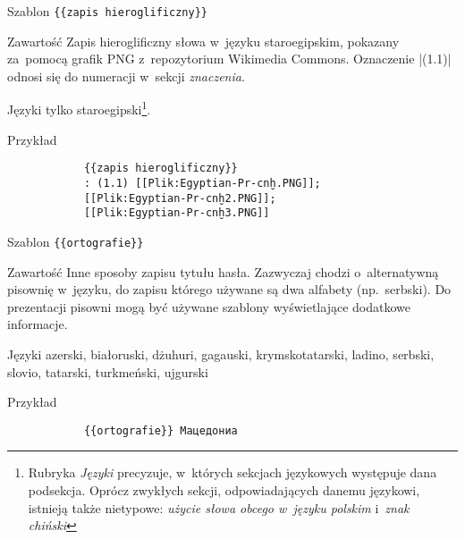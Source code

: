 \documentclass{pracamgr}
\begin{document}
\begin{opis}
	\item[Szablon] \verb|{{zapis hieroglificzny}}|
	\item[Zawartość] Zapis hieroglificzny słowa w~języku staroegipskim, pokazany za~pomocą grafik PNG z~repozytorium Wikimedia Commons. Oznaczenie \kod|(1.1)| odnosi się do numeracji w~sekcji \emph{znaczenia}.
	\item[Języki] tylko staroegipski\footnote{Rubryka \emph{Języki} precyzuje, w~których sekcjach językowych występuje dana podsekcja. Oprócz zwykłych sekcji, odpowiadających danemu językowi, istnieją także nietypowe: \emph{użycie słowa obcego w~języku polskim} i~\emph{znak chiński}}.
	\item[Przykład]
		\begin{verbatim}
			{{zapis hieroglificzny}}
			: (1.1) [[Plik:Egyptian-Pr-cnḫ.PNG]];
			[[Plik:Egyptian-Pr-cnḫ2.PNG]];
			[[Plik:Egyptian-Pr-cnḫ3.PNG]]
		\end{verbatim}
\end{opis}
\spacer
\begin{opis}
	\item[Szablon] \verb|{{ortografie}}|
	\item[Zawartość] Inne sposoby zapisu tytułu hasła. Zazwyczaj chodzi o~alternatywną pisownię w~języku, do zapisu którego używane są dwa alfabety (np.\ serbski). Do prezentacji pisowni mogą być używane szablony wyświetlające dodatkowe informacje.
	\item[Języki] azerski, białoruski, dżuhuri, gagauski, krymskotatarski, ladino, serbski, slovio, tatarski, turkmeński, ujgurski
	\item[Przykład]
		\begin{verbatim}
			{{ortografie}} Мацедониа
		\end{verbatim}
\end{opis}
\spacer
\end{document}
